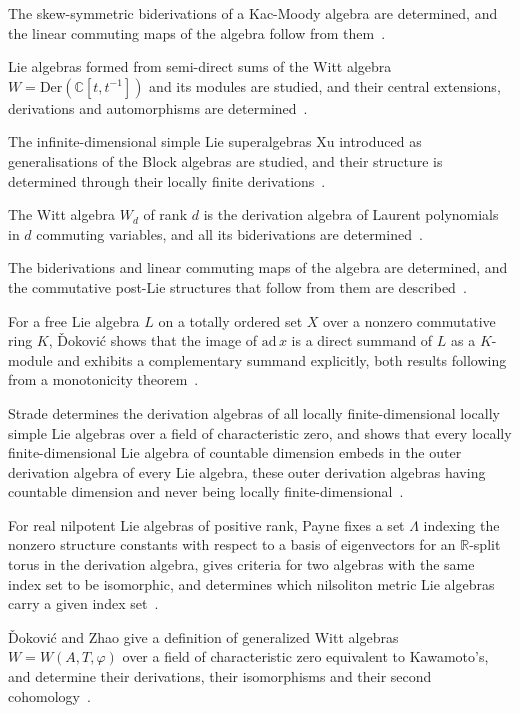 The skew-symmetric biderivations of a Kac-Moody algebra are determined, and the linear commuting maps of the algebra follow from them~\cite{WlSkew-symmetricBiderivation2023}.

Lie algebras formed from semi-direct sums of the Witt algebra $W=\mathrm{Der}(\mathbb{C}[t,t^{-1}])$ and its modules are studied, and their central extensions, derivations and automorphisms are determined~\cite{WlCentralExtensionsDerivationsAn2020}.

The infinite-dimensional simple Lie superalgebras Xu introduced as generalisations of the Block algebras are studied, and their structure is determined through their locally finite derivations~\cite{WlStructureOfLieSuperalgebrasOfB2019}.

The Witt algebra $W_d$ of rank $d$ is the derivation algebra of Laurent polynomials in $d$ commuting variables, and all its biderivations are determined~\cite{WlBiderivationsOfTheHigherRankWi2019}.

The biderivations and linear commuting maps of the algebra are determined, and the commutative post-Lie structures that follow from them are described~\cite{WlBiderivationsLinearCommutingMa2019}.

For a free Lie algebra $L$ on a totally ordered set $X$ over a nonzero commutative ring $K$, \v{D}okovi\'c shows that the image of $\mathrm{ad}\,x$ is a direct summand of $L$ as a $K$-module and exhibits a complementary summand explicitly, both results following from a monotonicity theorem~\cite{WlOnSomeInnerDerivationsOfFreeLi1988}.

Strade determines the derivation algebras of all locally finite-dimensional locally simple Lie algebras over a field of characteristic zero, and shows that every locally finite-dimensional Lie algebra of countable dimension embeds in the outer derivation algebra of every Lie algebra, these outer derivation algebras having countable dimension and never being locally finite-dimensional~\cite{WlLocallyFiniteDimensionalLieAlg1999}.

For real nilpotent Lie algebras of positive rank, Payne fixes a set $\Lambda$ indexing the nonzero structure constants with respect to a basis of eigenvectors for an $\mathbb{R}$-split torus in the derivation algebra, gives criteria for two algebras with the same index set to be isomorphic, and determines which nilsoliton metric Lie algebras carry a given index set~\cite{WlApplicationsOfIndexSetsAndNiko2014}.

\v{D}okovi\'c and Zhao give a definition of generalized Witt algebras $W=W(A,T,\varphi)$ over a field of characteristic zero equivalent to Kawamoto's, and determine their derivations, their isomorphisms and their second cohomology~\cite{WlDerivationsIsomorphismsAndSeco1998}.

